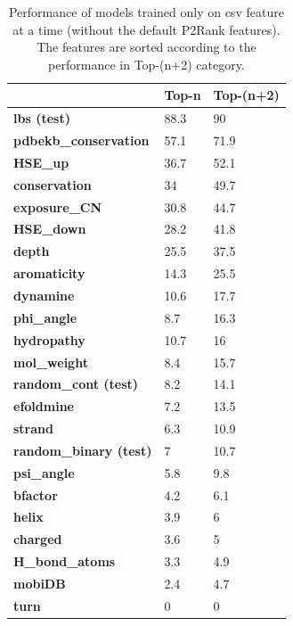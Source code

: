 \begin{table}[]
\centering
\begin{tabular}{lll}
\hline
                              & Top-n & Top-(n+2) \\ \hline
\textbf{lbs (test)}                  & 88.3  & 90        \\
\textbf{pdbekb\_conservation} & 57.1  & 71.9      \\
\textbf{HSE\_up}              & 36.7  & 52.1      \\
\textbf{conservation}         & 34    & 49.7      \\
\textbf{exposure\_CN}         & 30.8  & 44.7      \\
\textbf{HSE\_down}            & 28.2  & 41.8      \\
\textbf{depth}                & 25.5  & 37.5      \\
\textbf{aromaticity}          & 14.3  & 25.5      \\
\textbf{dynamine}             & 10.6  & 17.7      \\
\textbf{phi\_angle}           & 8.7   & 16.3      \\
\textbf{hydropathy}           & 10.7  & 16        \\
\textbf{mol\_weight}          & 8.4   & 15.7      \\
\textbf{random\_cont (test)}         & 8.2   & 14.1      \\
\textbf{efoldmine}            & 7.2   & 13.5      \\
\textbf{strand}               & 6.3   & 10.9      \\
\textbf{random\_binary (test)}       & 7     & 10.7      \\
\textbf{psi\_angle}           & 5.8   & 9.8       \\
\textbf{bfactor}              & 4.2   & 6.1       \\
\textbf{helix}                & 3.9   & 6         \\
\textbf{charged}              & 3.6   & 5         \\
\textbf{H\_bond\_atoms}       & 3.3   & 4.9       \\
\textbf{mobiDB}               & 2.4   & 4.7       \\
\textbf{turn}                 & 0     & 0         \\ \hline
\end{tabular}
\caption{Performance of models trained only on csv feature at a time (without the default P2Rank features). The features are sorted according to the performance in
Top-(n+2) category.}
\label{tab:p2rankCSVOne}
\end{table}

